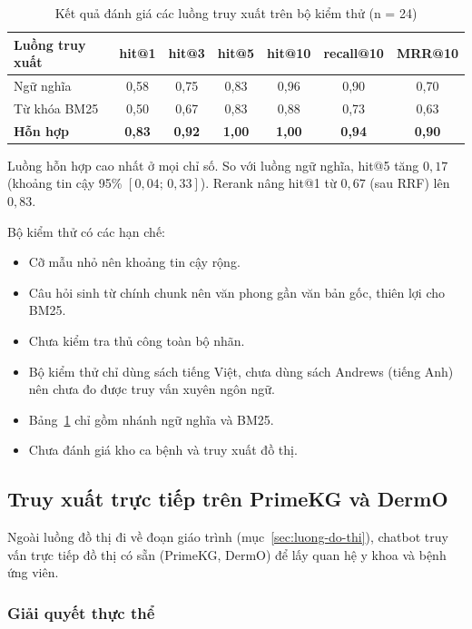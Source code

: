 \begin{table}[H]
\centering
\caption{Kết quả đánh giá các luồng truy xuất trên bộ kiểm thử (n = 24)}
\label{tab:ket-qua-truy-xuat}
\small
\begin{tabular}{|l|c|c|c|c|c|c|}
\hline
\textbf{Luồng truy xuất} & \textbf{hit@1} & \textbf{hit@3} & \textbf{hit@5} & \textbf{hit@10} & \textbf{recall@10} & \textbf{MRR@10} \\ \hline
Ngữ nghĩa & 0,58 & 0,75 & 0,83 & 0,96 & 0,90 & 0,70 \\ \hline
Từ khóa BM25 & 0,50 & 0,67 & 0,83 & 0,88 & 0,73 & 0,63 \\ \hline
\textbf{Hỗn hợp} & \textbf{0,83} & \textbf{0,92} & \textbf{1,00} & \textbf{1,00} & \textbf{0,94} & \textbf{0,90} \\ \hline
\end{tabular}
\end{table}

Luồng hỗn hợp cao nhất ở mọi chỉ số. So với luồng ngữ nghĩa, hit@5 tăng $0{,}17$ (khoảng tin cậy 95\% $[0{,}04;\,0{,}33]$). Rerank nâng hit@1 từ $0{,}67$ (sau RRF) lên $0{,}83$.

Bộ kiểm thử có các hạn chế:
\begin{itemize}
  \item Cỡ mẫu nhỏ nên khoảng tin cậy rộng.
  \item Câu hỏi sinh từ chính chunk nên văn phong gần văn bản gốc, thiên lợi cho BM25.
  \item Chưa kiểm tra thủ công toàn bộ nhãn.
  \item Bộ kiểm thử chỉ dùng sách tiếng Việt, chưa dùng sách Andrews (tiếng Anh) nên chưa đo được truy vấn xuyên ngôn ngữ.
  \item Bảng~\ref{tab:ket-qua-truy-xuat} chỉ gồm nhánh ngữ nghĩa và BM25. %
  \item Chưa đánh giá kho ca bệnh và truy xuất đồ thị.
\end{itemize}

\subsection{Truy xuất trực tiếp trên PrimeKG và DermO}
\label{sec:truy-xuat-do-thi}

Ngoài luồng đồ thị đi về đoạn giáo trình (mục~\ref{sec:luong-do-thi}), chatbot truy vấn trực tiếp đồ thị có sẵn (PrimeKG, DermO) để lấy quan hệ y khoa và bệnh ứng viên.

\subsubsection{Giải quyết thực thể}

